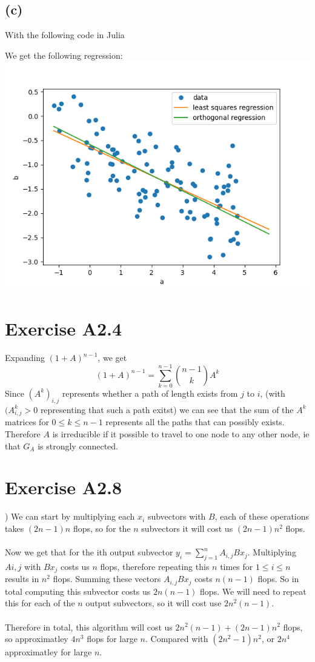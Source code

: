 \subsection*{(c)}
With the following code in Julia 

We get the following regression:\\
\includegraphics[scale=0.5]{test.png}
\section*{Exercise A2.4}
Expanding $(1+A)^{n-1}$, we get
$$
(1+A)^{n-1}=\sum_{k=0}^{n-1}{{n-1} \choose {k}} A^k$$
Since $(A^k)_{i,j}$ represents whether a path of length exists from $j$ to $i$, (with $(A^k_{i,j}>0$ representing that such a path exitst)
we can see that the sum of the $A^k$ matrices for $0\leq k \leq n-1$ represents all the paths that can possibly exists. Therefore $A$ is
irreducible if it possible to travel to one node to any other node, ie that $G_A$ is strongly connected.
\section*{Exercise A2.8})
We can start by multiplying each $x_i$ subvectors with $B$, each of these operations takes $(2n-1)n$ flops, so for the $n$ subvectors it will cost us $(2n-1)n^2$ flops.
\\\\Now we get that for the ith output subvector $y_i=\sum_{j=1}^{n}A_{i,j}Bx_j$. Multiplying $A{i,j}$ with $Bx_j$ costs us $n$ flops, therefore repeating this $n$ times for 
$1\leq i \leq n$ results in $n^2$ flops. Summing these vectors $A_{i,j}Bx_j$ costs $n(n-1)$ flops. So in total computing this subvector costs us $2n(n-1)$ flops. We will need to repeat this for each of the $n$ output subvectors, so it will cost use $2n^2(n-1)$.\\\\
Therefore in total, this algorithm will cost us $2n^2(n-1)+(2n-1)n^2$ flops, so approximatley $4n^3$ flops for large $n$. Compared with $(2n^2-1)n^2$, or $2n^4$ approximatley for large $n$.
